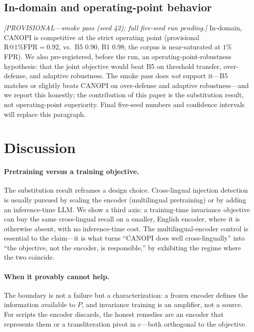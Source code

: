 \documentclass[pdflatex,sn-mathphys-num]{sn-jnl}
\makeatletter
\newcommand{\Rfpr}{\textrm{R@1\%FPR}}
\newcommand{\canon}{c}
\theoremstyle{plain}
\makeatother
\begin{document}
\subsection{In-domain and operating-point behavior}\label{sec:res-op}
\emph{[PROVISIONAL---smoke pass (seed 42); full five-seed run pending.]} In-domain,
CANOPI is competitive at the strict operating point (provisional $\Rfpr=0.92$, vs.\
B5 $0.90$, B1 $0.98$; the corpus is near-saturated at $1\%$ FPR). We also
pre-registered, before the run, an operating-point-robustness hypothesis: that the
joint objective would beat B5 on threshold transfer, over-defense, and adaptive
robustness. The smoke pass does \emph{not} support it---B5 matches or slightly beats
CANOPI on over-defense and adaptive robustness---and we report this honestly; the
contribution of this paper is the substitution result, not operating-point
superiority. Final five-seed numbers and confidence intervals will replace this
paragraph.

\section{Discussion}\label{sec:discussion}

\paragraph{Pretraining versus a training objective.} The substitution result reframes
a design choice. Cross-lingual injection detection is usually pursued by scaling the
encoder (multilingual pretraining) or by adding an inference-time LLM. We show a
third axis: a training-time invariance objective can buy the same cross-lingual
recall on a smaller, English encoder, where it is otherwise absent, with no
inference-time cost. The multilingual-encoder control is essential to the claim---it
is what turns ``CANOPI does well cross-lingually'' into ``the objective, not the
encoder, is responsible,'' by exhibiting the regime where the two coincide.

\paragraph{When it provably cannot help.} The boundary is not a failure but a
characterization: a frozen encoder defines the information available to $P$, and
invariance training is an amplifier, not a source. For scripts the encoder discards,
the honest remedies are an encoder that represents them or a transliteration pivot
in $\canon$---both orthogonal to the objective.
\end{document}
